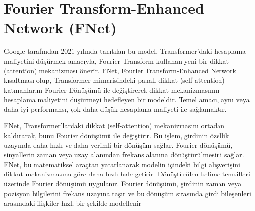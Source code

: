 \section{Fourier Transform-Enhanced Network (FNet)}

Google tarafından 2021 yılında tanıtılan bu model, Transformer'daki hesaplama maliyetini düşürmek amacıyla, Fourier Transform kullanan yeni bir dikkat (attention) mekanizması önerir. FNet, Fourier Transform-Enhanced Network kısaltması olup, Transformer mimarisindeki pahalı dikkat (self-attention) katmanlarını Fourier Dönüşümü ile değiştirerek dikkat mekanizmasının hesaplama maliyetini düşürmeyi hedefleyen bir modeldir. Temel amacı, aynı veya daha iyi performansı, çok daha düşük hesaplama maliyeti ile sağlamaktır.

FNet, Transformer'lardaki dikkat (self-attention) mekanizmasını ortadan kaldırarak, bunu Fourier dönüşümü ile değiştirir. Bu işlem, girdinin özellik uzayında daha hızlı ve daha verimli bir dönüşüm sağlar. Fourier dönüşümü, sinyallerin zaman veya uzay alanından frekans alanına dönüştürülmesini sağlar. FNet, bu matematiksel araçtan yararlanarak modelin içindeki bilgi alışverişini dikkat mekanizmasına göre daha hızlı hale getirir. Dönüştürülen kelime temsilleri üzerinde Fourier dönüşümü uygulanır. Fourier dönüşümü, girdinin zaman veya pozisyon bilgilerini frekans uzayına taşır ve bu dönüşüm sırasında girdi bileşenleri arasındaki ilişkiler hızlı bir şekilde modellenir

\newpage